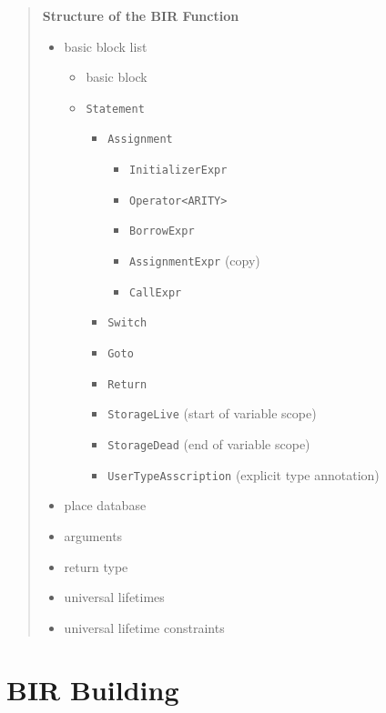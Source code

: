 \documentclass[
  11pt,
  twoside,symmetric]{report}
\providecommand{\tightlist}{%
  \setlength{\itemsep}{0pt}\setlength{\parskip}{0pt}}
\begin{document}
\begin{quote}
\textbf{Structure of the BIR Function}

\begin{itemize}
\tightlist
\item
  basic block list

  \begin{itemize}
  \tightlist
  \item
    basic block
  \item
    \texttt{Statement}

    \begin{itemize}
    \tightlist
    \item
      \texttt{Assignment}

      \begin{itemize}
      \tightlist
      \item
        \texttt{InitializerExpr}
      \item
        \texttt{Operator\textless{}ARITY\textgreater{}}
      \item
        \texttt{BorrowExpr}
      \item
        \texttt{AssignmentExpr} (copy)
      \item
        \texttt{CallExpr}
      \end{itemize}
    \item
      \texttt{Switch}
    \item
      \texttt{Goto}
    \item
      \texttt{Return}
    \item
      \texttt{StorageLive} (start of variable scope)
    \item
      \texttt{StorageDead} (end of variable scope)
    \item
      \texttt{UserTypeAsscription} (explicit type annotation)
    \end{itemize}
  \end{itemize}
\item
  place database
\item
  arguments
\item
  return type
\item
  universal lifetimes
\item
  universal lifetime constraints
\end{itemize}
\end{quote}

\section{BIR Building}\label{bir-building}
\end{document}
